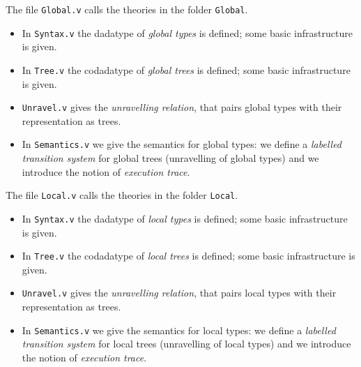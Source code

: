 \documentclass[11pt, a4paper,UKenglish,cleveref, autoref, thm-restate]{article}
\begin{document}
The file \texttt{Global.v} calls the theories in the folder \texttt{Global}.
\begin{itemize}
\item In \texttt{Syntax.v} the dadatype of \emph{global types} is defined; some basic infrastructure is given.
\item In \texttt{Tree.v} the codadatype of \emph{global trees} is defined; some basic infrastructure is given.
\item \texttt{Unravel.v} gives the \emph{unravelling relation}, that pairs global types with their representation as trees.
\item In \texttt{Semantics.v} we give the semantics for global types: we define a \emph{labelled transition system} for global trees (unravelling of global types) and we introduce the notion of \emph{execution trace}.
\end{itemize}

The file \texttt{Local.v} calls the theories in the folder \texttt{Local}.
\begin{itemize}
\item In \texttt{Syntax.v} the dadatype of \emph{local types} is defined; some basic infrastructure is given.
\item In \texttt{Tree.v} the codadatype of \emph{local trees} is defined; some basic infrastructure is given.
\item \texttt{Unravel.v} gives the \emph{unravelling relation}, that pairs local types with their representation as trees.
\item In \texttt{Semantics.v} we give the semantics for local types: we define a \emph{labelled transition system} for local trees (unravelling of local types) and we introduce the notion of \emph{execution trace}.
\end{itemize}
\end{document}
